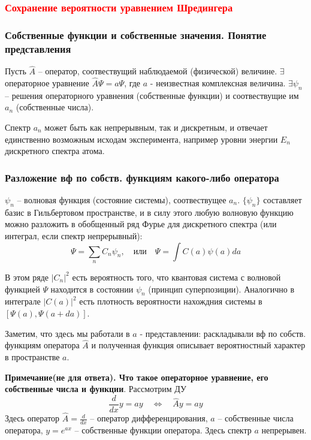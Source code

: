 \subsubsection{\textcolor{red}{Сохранение вероятности уравнением Шредингера}}
\subsubsection{Собственные функции и собственные значения. Понятие представления}

Пусть $\hat{A}$ -- оператор, соотвествущий наблюдаемой (физической) величине. $\exists$ операторное уравнение $\hat{A}\Psi=a\Psi$, где $a$ - неизвестная комплексная величина. $\exists \psi_n$ -- решения операторного уравнения (собственные функции) и соотвествущие им  $a_n$ (собственные числа). 

Спектр $a_n$ может быть как непрерывным, так и дискретным, и отвечает единственно возможным исходам эксперимента, например уровни энергии $E_n$ дискретного спектра атома. 

\subsubsection{Разложение вф по собств. функциям какого-либо оператора}

$\psi_n$ -- волновая функция (состояние системы), соотвествущее $a_n$. $\{\psi_n\}$ составляет базис в Гильбертовом пространстве, и в силу этого любую волновую функцию можно разложить в обобщенный ряд Фурье для дискретного спектра (или интеграл, если спектр непрерывный): 
$$
\Psi=\sum\limits_n C_n\psi_n, \quad \text{или} \quad
\Psi=\int\limits C(a)\psi(a)da
$$

В этом ряде $|C_n|^2$ есть вероятность того, что квантовая система с волновой функцией $\Psi$ находится в состоянии $\psi_n$ (принцип суперпозиции). Аналогично в интеграле $|C(a)|^2$ есть плотность вероятности нахождния системы в $[\Psi(a),\Psi(a+da)]$.

Заметим, что здесь мы работали в $a$ - представлении: раскладывали вф по собств. функциям оператора $\hat{A}$ и полученная функция описывает вероятностный характер в пространстве $a$.

\textbf{Примечание(не для ответа). Что такое операторное уравнение, его собственные числа и функции}. Рассмотрим ДУ
$$
\frac{d}{dx}y=ay \quad\Longleftrightarrow\quad \hat{A}y=ay
$$
Здесь оператор $\hat{A}=\frac{d}{dx}$ -- оператор дифференцирования, $a$ -- собственные числа оператора, $y=e^{ax}$ -- собственные функции оператора. Здесь спектр $a$ непрерывен.

